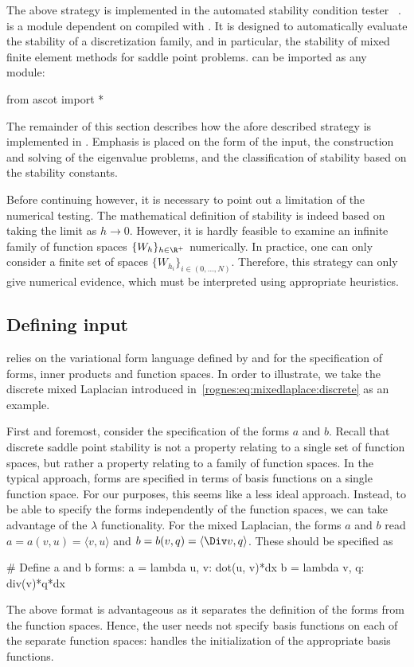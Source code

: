 The above strategy is implemented in the automated stability condition
tester \rognesascot{}~\cite{www:ascot}. \rognesascot{} is a
\rognespython{} module dependent on \pydolfin{} compiled with
\slepc{}. It is designed to automatically evaluate the stability of a
discretization family, and in particular, the stability of mixed
finite element methods for saddle point problems. \rognesascot{} can
be imported as any \rognespython{} module:
\begin{python}
  from ascot import *
\end{python}
The remainder of this section describes how the afore described
strategy is implemented in \rognesascot{}. Emphasis is placed on the form of
the input, the construction and solving of the eigenvalue problems,
and the classification of stability based on the stability constants.

Before continuing however, it is necessary to point out a limitation
of the numerical testing. The mathematical definition of stability is
indeed based on taking the limit as $h \rightarrow 0$. However, it is
hardly feasible to examine an infinite family of function spaces
$\{W_h\}_{h \in \R^{+}}$ numerically. In practice, one can only
consider a finite set of spaces $\{W_{h_i}\}_{i \in (0, \dots,
  N)}$. Therefore, this strategy can only give numerical evidence,
which must be interpreted using appropriate heuristics.

\subsection{Defining input}
\label{rognes:subsec:input}

\rognesascot{} relies on the variational form language defined by \ufl{} and
\pydolfin{} for the specification of forms, inner products and
function spaces.  In order to illustrate, we take the discrete mixed
Laplacian introduced in~\eqref{rognes:eq:mixedlaplace:discrete} as an
example.

First and foremost, consider the specification of the forms $a$ and
$b$. Recall that discrete saddle point stability is not a property
relating to a single set of function spaces, but rather a property
relating to a family of function spaces. In the typical \pydolfin{}
approach, forms are specified in terms of basis functions on a single
function space. For our purposes, this seems like a less ideal
approach. Instead, to be able to specify the forms independently of
the function spaces, we can take advantage of the \rognespython{}
$\lambda$ functionality. For the mixed Laplacian, the forms $a$ and
$b$ read $a = a(v, u) = \langle v, u \rangle$ and $b = b(v, q) =
\langle \Div v, q \rangle$. These should be specified as
\begin{python}
  # Define a and b forms:
  a = lambda u, v: dot(u, v)*dx
  b = lambda v, q: div(v)*q*dx
\end{python}
The above format is advantageous as it separates the definition of the
forms from the function spaces. Hence, the user needs not specify
basis functions on each of the separate function spaces: \rognesascot{}
handles the initialization of the appropriate basis functions.

